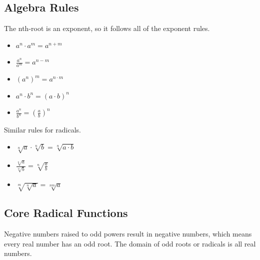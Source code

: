 \documentclass{ximera}
\begin{document}
\subsection*{Algebra Rules}

The nth-root is an exponent, so it follows all of the exponent rules.


\begin{itemize}
\item $a^n \cdot a^m = a^{n+m}$

\item $\frac{a^n}{a^m} = a^{n-m}$

\item $(a^n)^m = a^{n \cdot m}$

\item $a^n \cdot b^n = (a \cdot b)^n$

\item $\frac{a^n}{b^n} = \left(\frac{a}{b}\right)^n$


\end{itemize}



Similar rules for radicals.

\begin{itemize}

\item $\sqrt[n]{a} \cdot \sqrt[n]{b} = \sqrt[n]{a \cdot b}$

\item $\frac{\sqrt[n]{a}}{\sqrt[n]{b}} = \sqrt[n]{\frac{a}{b}}$

\item $\sqrt[m]{\sqrt[n]{a}} = \sqrt[nm]{a}$

\end{itemize}





















\subsection*{Core Radical Functions}



Negative numbers raised to odd powers result in negative numbers, which means every real number has an odd root.  The domain of odd roots or radicals is all real numbers.
\end{document}
